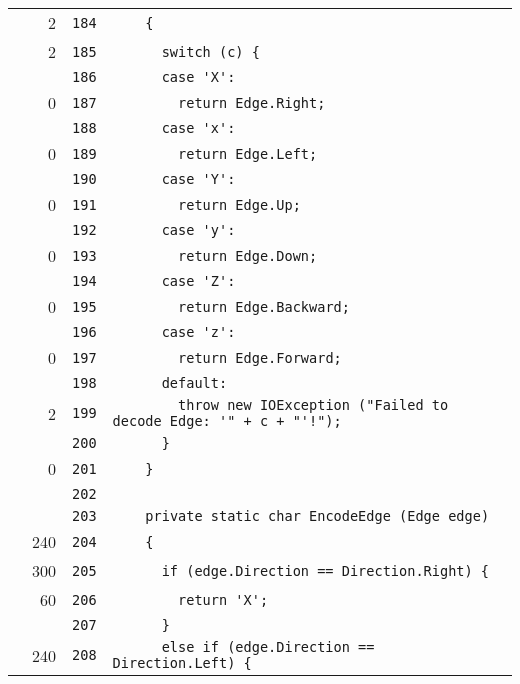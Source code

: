 \documentclass[a4paper,10pt]{article}
\begin{document}
\begin{longtable}[l]{lrrl}
\cellcolor{green} & 2 & \verb~184~ & \verb~    {~\\
\cellcolor{green} & 2 & \verb~185~ & \verb~      switch (c) {~\\
\cellcolor{gray} &  & \verb~186~ & \verb~      case 'X':~\\
\cellcolor{red} & 0 & \verb~187~ & \verb~        return Edge.Right;~\\
\cellcolor{gray} &  & \verb~188~ & \verb~      case 'x':~\\
\cellcolor{red} & 0 & \verb~189~ & \verb~        return Edge.Left;~\\
\cellcolor{gray} &  & \verb~190~ & \verb~      case 'Y':~\\
\cellcolor{red} & 0 & \verb~191~ & \verb~        return Edge.Up;~\\
\cellcolor{gray} &  & \verb~192~ & \verb~      case 'y':~\\
\cellcolor{red} & 0 & \verb~193~ & \verb~        return Edge.Down;~\\
\cellcolor{gray} &  & \verb~194~ & \verb~      case 'Z':~\\
\cellcolor{red} & 0 & \verb~195~ & \verb~        return Edge.Backward;~\\
\cellcolor{gray} &  & \verb~196~ & \verb~      case 'z':~\\
\cellcolor{red} & 0 & \verb~197~ & \verb~        return Edge.Forward;~\\
\cellcolor{gray} &  & \verb~198~ & \verb~      default:~\\
\cellcolor{green} & 2 & \verb~199~ & \verb~        throw new IOException ("Failed to decode Edge: '" + c + "'!");~\\
\cellcolor{gray} &  & \verb~200~ & \verb~      }~\\
\cellcolor{red} & 0 & \verb~201~ & \verb~    }~\\
\cellcolor{gray} &  & \verb~202~ & \verb~~\\
\cellcolor{gray} &  & \verb~203~ & \verb~    private static char EncodeEdge (Edge edge)~\\
\cellcolor{green} & 240 & \verb~204~ & \verb~    {~\\
\cellcolor{green} & 300 & \verb~205~ & \verb~      if (edge.Direction == Direction.Right) {~\\
\cellcolor{green} & 60 & \verb~206~ & \verb~        return 'X';~\\
\cellcolor{gray} &  & \verb~207~ & \verb~      }~\\
\cellcolor{green} & 240 & \verb~208~ & \verb~      else if (edge.Direction == Direction.Left) {~\\

\end{longtable}
\end{document}
